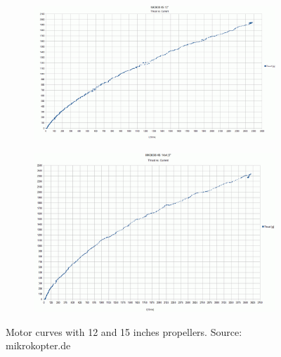 \begin{figure}[h]
  \centering
  \begin{subfigure}{0.9\textwidth}
    \centering
    \includegraphics[width=\linewidth]{figs/curve12.png}
  
  \end{subfigure}
  
  \begin{subfigure}{0.9\textwidth}
    \centering
    \includegraphics[width=\linewidth]{figs/curve15.png}

  \end{subfigure}
  \caption{Motor curves with 12 and 15 inches propellers. Source: mikrokopter.de}
  \label{fig:motorcurves}
\end{figure}

